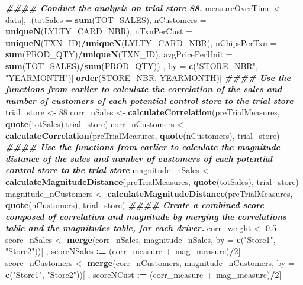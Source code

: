 \documentclass[
]{article}
\newenvironment{Shaded}{\begin{snugshade}}{\end{snugshade}}
\newcommand{\AttributeTok}[1]{\textcolor[rgb]{0.13,0.29,0.53}{#1}}
\newcommand{\DecValTok}[1]{\textcolor[rgb]{0.00,0.00,0.81}{#1}}
\newcommand{\DocumentationTok}[1]{\textcolor[rgb]{0.56,0.35,0.01}{\textbf{\textit{#1}}}}
\newcommand{\FloatTok}[1]{\textcolor[rgb]{0.00,0.00,0.81}{#1}}
\newcommand{\FunctionTok}[1]{\textcolor[rgb]{0.13,0.29,0.53}{\textbf{#1}}}
\newcommand{\NormalTok}[1]{#1}
\newcommand{\OtherTok}[1]{\textcolor[rgb]{0.56,0.35,0.01}{#1}}
\newcommand{\SpecialCharTok}[1]{\textcolor[rgb]{0.81,0.36,0.00}{\textbf{#1}}}
\newcommand{\StringTok}[1]{\textcolor[rgb]{0.31,0.60,0.02}{#1}}
\begin{document}
\begin{Shaded}
\begin{Highlighting}[]
\DocumentationTok{\#\#\#\# Conduct the analysis on trial store 88.}
\NormalTok{measureOverTime }\OtherTok{\textless{}{-}}\NormalTok{ data[, .(}\AttributeTok{totSales =} \FunctionTok{sum}\NormalTok{(TOT\_SALES),}
\AttributeTok{nCustomers =} \FunctionTok{uniqueN}\NormalTok{(LYLTY\_CARD\_NBR),}
\AttributeTok{nTxnPerCust =} \FunctionTok{uniqueN}\NormalTok{(TXN\_ID)}\SpecialCharTok{/}\FunctionTok{uniqueN}\NormalTok{(LYLTY\_CARD\_NBR),}
\AttributeTok{nChipsPerTxn =} \FunctionTok{sum}\NormalTok{(PROD\_QTY)}\SpecialCharTok{/}\FunctionTok{uniqueN}\NormalTok{(TXN\_ID),}
\AttributeTok{avgPricePerUnit =} \FunctionTok{sum}\NormalTok{(TOT\_SALES)}\SpecialCharTok{/}\FunctionTok{sum}\NormalTok{(PROD\_QTY))}
\NormalTok{, by }\OtherTok{=} \FunctionTok{c}\NormalTok{(}\StringTok{"STORE\_NBR"}\NormalTok{, }\StringTok{"YEARMONTH"}\NormalTok{)][}\FunctionTok{order}\NormalTok{(STORE\_NBR, YEARMONTH)]}
\DocumentationTok{\#\#\#\# Use the functions from earlier to calculate the correlation of the sales and number of customers of each potential control store to the trial store}
\NormalTok{trial\_store }\OtherTok{\textless{}{-}} \DecValTok{88}
\NormalTok{corr\_nSales }\OtherTok{\textless{}{-}} \FunctionTok{calculateCorrelation}\NormalTok{(preTrialMeasures, }\FunctionTok{quote}\NormalTok{(totSales),trial\_store)}
\NormalTok{corr\_nCustomers }\OtherTok{\textless{}{-}} \FunctionTok{calculateCorrelation}\NormalTok{(preTrialMeasures, }\FunctionTok{quote}\NormalTok{(nCustomers), trial\_store)}
\DocumentationTok{\#\#\#\# Use the functions from earlier to calculate the magnitude distance of the sales and number of customers of each potential control store to the trial store}
\NormalTok{magnitude\_nSales }\OtherTok{\textless{}{-}} \FunctionTok{calculateMagnitudeDistance}\NormalTok{(preTrialMeasures, }\FunctionTok{quote}\NormalTok{(totSales), trial\_store)}
\NormalTok{magnitude\_nCustomers }\OtherTok{\textless{}{-}} \FunctionTok{calculateMagnitudeDistance}\NormalTok{(preTrialMeasures, }\FunctionTok{quote}\NormalTok{(nCustomers), trial\_store)}
\DocumentationTok{\#\#\#\# Create a combined score composed of correlation and magnitude by merging the correlations table and the magnitudes table, for each driver.}
\NormalTok{corr\_weight }\OtherTok{\textless{}{-}} \FloatTok{0.5}
\NormalTok{score\_nSales }\OtherTok{\textless{}{-}} \FunctionTok{merge}\NormalTok{(corr\_nSales, magnitude\_nSales, }\AttributeTok{by =} \FunctionTok{c}\NormalTok{(}\StringTok{"Store1"}\NormalTok{, }\StringTok{"Store2"}\NormalTok{))[ , scoreNSales }\SpecialCharTok{:=}\NormalTok{ (corr\_measure }\SpecialCharTok{+}\NormalTok{ mag\_measure)}\SpecialCharTok{/}\DecValTok{2}\NormalTok{]}
\NormalTok{score\_nCustomers }\OtherTok{\textless{}{-}} \FunctionTok{merge}\NormalTok{(corr\_nCustomers, magnitude\_nCustomers, }\AttributeTok{by =} \FunctionTok{c}\NormalTok{(}\StringTok{"Store1"}\NormalTok{, }\StringTok{"Store2"}\NormalTok{))[ , scoreNCust }\SpecialCharTok{:=}\NormalTok{ (corr\_measure }\SpecialCharTok{+}\NormalTok{ mag\_measure)}\SpecialCharTok{/}\DecValTok{2}\NormalTok{]}


\end{Highlighting}
\end{Shaded}
\end{document}
